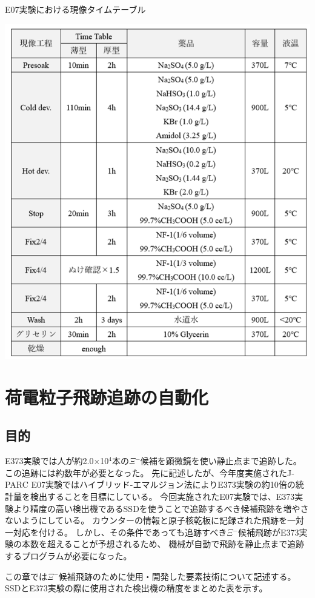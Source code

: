 \documentclass[12pt,a4paper]{jarticle}
\begin{document}
\begin{table}[htbp]
\centering
\caption{E07実験における現像タイムテーブル\label{tab:gennzou_timetable}}
\begin{center}
    \includegraphics[width=150mm]{gennzou_timetable.png}
\end{center}
\end{table}


\newpage
\section{荷電粒子飛跡追跡の自動化}
\subsection{目的}
E373実験では人が約2.0×10$^4$本の$\Xi$$^-$候補を顕微鏡を使い静止点まで追跡した。
この追跡には約数年が必要となった。
先に記述したが、今年度実施されたJ-PARC E07実験ではハイブリッド-エマルジョン法によりE373実験の約10倍の統計量を検出することを目標にしている。
今回実施されたE07実験では、E373実験より精度の高い検出機であるSSDを使うことで追跡するべき候補飛跡を増やさないようにしている。
カウンターの情報と原子核乾板に記録された飛跡を一対一対応を付ける。
しかし、その条件であっても追跡すべき$\Xi$$^-$候補飛跡がE373実験の本数を超えることが予想されるため、
機械が自動で飛跡を静止点まで追跡するプログラムが必要になった。
\par
この章では$\Xi$$^-$候補飛跡のために使用・開発した要素技術について記述する。
SSDとE373実験の際に使用された検出機の精度をまとめた表を示す。
\end{document}
